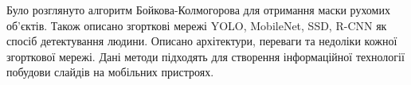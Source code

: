 \chapterConclusion

Було розглянуто алгоритм Бойкова-Колмогорова для
отримання маски рухомих об'єктів. Також описано
згорткові мережі YOLO, MobileNet, SSD, R-CNN
як спосіб детектування людини. 
Описано архітектури, переваги та недоліки кожної 
згорткової мережі.
Дані методи підходять для
створення інформаційної технології побудови слайдів на 
мобільних пристроях.